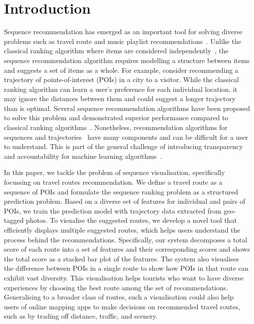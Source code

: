 
\section{Introduction}
Sequence recommendation has emerged as an important tool for solving diverse problems such as travel route and music playlist recommendations~\cite{chen2017SR}. 
Unlike the classical ranking algorithm where items are considered independently~\cite{koren2009matrix},
the sequence recommendation algorithm requires modelling a structure between items and suggests a set of items as a whole. 
For example, consider recommending a trajectory of points-of-interest (POIs) in a city to a visitor. 
While the classical ranking algorithm can learn a user's preference for each individual location, it may ignore the distances between them and could suggest a longer trajectory than is optimal. 
Several sequence recommendation algorithms have been proposed to solve this problem and demonstrated superior performance compared to classical ranking algorithms~\cite{ijcai15,chen2017SR}. 
Nonetheless, recommendation algorithms for sequences and trajectories~\cite{chen2016learning,chen2017SR} have many components and can be difficult for a user to understand. This is part of the general challenge of introducing transparency and accountability for machine learning algorithms~\cite{fatml}. 

In this paper, we tackle the problem of sequence visualisation, specifically focussing on travel routes recommendation. 
We define a travel route as a sequence of POIs and formulate the sequence ranking problem as a structured prediction problem. 
Based on a diverse set of features for individual and pairs of POIs, we train the prediction model with trajectory data extracted from geo-tagged photos. 
To visualise the suggested routes, we develop a novel tool that efficiently displays multiple suggested routes, which helps users understand the process behind the recommendations.
Specifically, our system decomposes a total score of each route into a set of features and their corresponding scores and shows the total score as a stacked bar plot of the features.
The system also visualises the difference between POIs in a single route to show how POIs in that route can exhibit vast diversity. 
This visualisation helps tourists who want to have diverse experiences by choosing the best route among the set of recommendations. Generalising to a broader class of routes, such a visualisation could also help users of online mapping apps to make decisions on recommended travel routes, such as by trading off distance, traffic, and scenery. 
